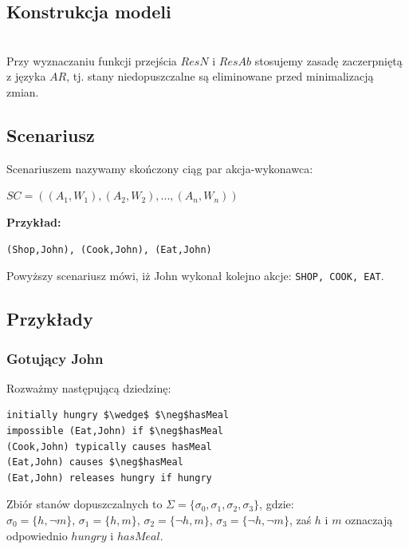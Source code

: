 \documentclass{article}
\begin{document}
\subsection{Konstrukcja modeli}\mbox{}\\
Przy wyznaczaniu funkcji przejścia $ResN$ i $ResAb$ stosujemy zasadę zaczerpniętą z języka $AR$, tj. stany niedopuszczalne są eliminowane przed minimalizacją zmian.
\subsection{Scenariusz}
Scenariuszem nazywamy skończony ciąg par akcja-wykonawca:
\begin{center}
$SC=((A_1,W_1),(A_2,W_2),...,(A_n,W_n))$
\end{center}
\textbf{Przykład:}
\begin{lstlisting}[mathescape=true]
(Shop,John), (Cook,John), (Eat,John)
\end{lstlisting}
Powyższy scenariusz mówi, iż John wykonał kolejno akcje: \texttt{SHOP, COOK, EAT}.

\subsection{Przykłady}
\subsubsection{Gotujący John}

Rozważmy następującą dziedzinę:
\bigskip
{}
\begin{lstlisting}[mathescape=true]
initially hungry $\wedge$ $\neg$hasMeal 
impossible (Eat,John) if $\neg$hasMeal 
(Cook,John) typically causes hasMeal
(Eat,John) causes $\neg$hasMeal 
(Eat,John) releases hungry if hungry
\end{lstlisting}
Zbiór stanów dopuszczalnych to $\Sigma=\{\sigma_{0},\sigma_{1},\sigma_{2},\sigma_{3}\}$, gdzie:\\
$\sigma_{0}=\{h,\neg m\}$, $\sigma_{1}=\{h, m\}$, $\sigma_{2}=\{\neg h, m\}$, $\sigma_{3}=\{\neg h,\neg m\}$, zaś $h$ i $m$ oznaczają odpowiednio $hungry$ i $hasMeal$.\\
\end{document}
